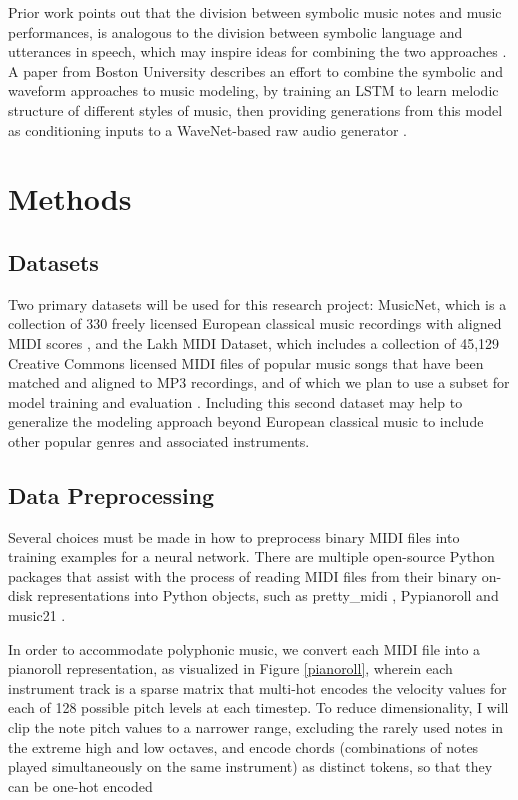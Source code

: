 \documentclass[sigconf,authorversion]{acmart}
\begin{document}
Prior work points out that the division between symbolic music notes
and music performances, is analogous to the division between symbolic
language and utterances in speech, which may inspire ideas for
combining the two approaches \cite{hawthorne2019enabling}. A paper
from Boston University describes an effort to combine the symbolic and
waveform approaches to music modeling, by training an LSTM to learn
melodic structure of different styles of music, then providing
generations from this model as conditioning inputs to a WaveNet-based
raw audio generator \cite{manzelli_conditioning_2018}.

\section{Methods}

\subsection{Datasets}

Two primary datasets will be used for this research project: MusicNet,
which is a collection of 330 freely licensed European classical music
recordings with aligned MIDI scores \cite{thickstun2017learning}, and
the Lakh MIDI Dataset, which includes a collection of 45,129 Creative
Commons licensed MIDI files of popular music songs that have been
matched and aligned to MP3 recordings, and of which we plan to use a
subset for model training and evaluation
\cite{raffel_learning-based_2016}. Including this second dataset may
help to generalize the modeling approach beyond European classical
music to include other popular genres and associated instruments.


\subsection{Data Preprocessing}

Several choices must be made in how to preprocess binary MIDI files
into training examples for a neural network. There are multiple
open-source Python packages that assist with the process of reading
MIDI files from their binary on-disk representations into Python
objects, such as pretty\_midi \cite{raffel_pretty_midi_2014},
Pypianoroll \cite{dong_pypianoroll_2018} and music21
\cite{cuthbert_music21_2010}.

In order to accommodate polyphonic music, we convert each MIDI file
into a pianoroll representation, as visualized in Figure
\ref{pianoroll}, wherein each instrument track is a sparse matrix that
multi-hot encodes the velocity values for each of 128 possible pitch
levels at each timestep. To reduce dimensionality, I will clip the
note pitch values to a narrower range, excluding the rarely used notes
in the extreme high and low octaves, and encode chords (combinations
of notes played simultaneously on the same instrument) as distinct
tokens, so that they can be one-hot encoded
\end{document}
